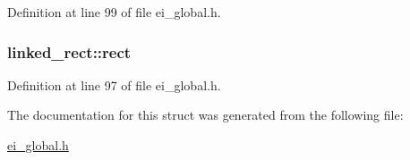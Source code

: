Definition at line 99 of file ei\_\-global.h.\hypertarget{structlinked__rect_a1dfa42b78294e86d12ea8ab4af385fc6}{
\subsubsection[{rect}]{ {\bf linked\_\-rect::rect}}}
\label{structlinked__rect_a1dfa42b78294e86d12ea8ab4af385fc6}


Definition at line 97 of file ei\_\-global.h.

The documentation for this struct was generated from the following file:\begin{DoxyCompactItemize}
\item 
\hyperlink{ei__global_8h}{ei\_\-global.h}\end{DoxyCompactItemize}
